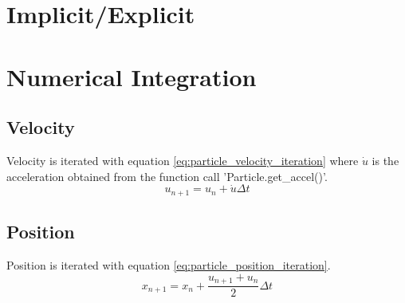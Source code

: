 \documentclass[10pt,a4paper,titlepage]{report}
\begin{document}
\section{Implicit/Explicit}
\section{Numerical Integration} \label{sec:Numerical Integration}
\subsection{Velocity}
Velocity is iterated with equation \ref{eq:particle_velocity_iteration} where $\dot{u}$ is the acceleration obtained from the function call 'Particle.get{\_}accel()'.
\begin{equation}
u_{n+1} = u_{n} + \dot{u} \Delta t
\label{eq:particle_velocity_iteration}
\end{equation}
\subsection{Position}
Position is iterated with equation \ref{eq:particle_position_iteration}.
\begin{equation}
x_{n+1} = x_{n} + \dfrac{u_{n+1} + u_{n}}{2}\Delta t 
\label{eq:particle_position_iteration}
\end{equation}
\end{document}
